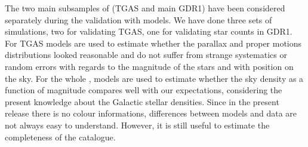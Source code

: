 The two main subsamples of {} (TGAS and main GDR1) have been considered separately during the validation with models. We have done three sets of simulations, two for validating TGAS, one for validating star counts in GDR1. For TGAS models are used to estimate whether the parallax and proper motions distributions looked reasonable and do not suffer from strange systematics or random errors with regards to the magnitude of the stars and with position on the sky. For the whole {}, models are used to estimate whether the sky density as a function of magnitude compares well with our expectations, considering the present knowledge about the Galactic stellar densities. Since in the present release there is no colour informations, differences between models and data are not always easy to understand. However, it is still useful to estimate the completeness of the catalogue.



  